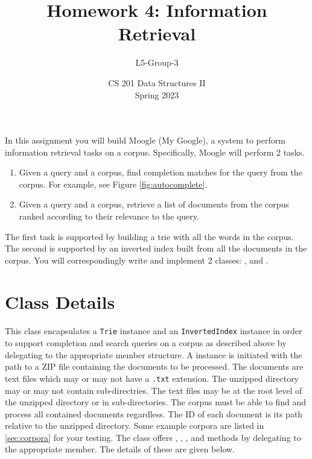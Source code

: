 \documentclass[addpoints]{exam}
\title{Homework 4: Information Retrieval}
\author{L5-Group-3}  %
\date{CS 201 Data Structures II\\Spring 2023}
\begin{document}
\maketitle

In this assignment you will build Moogle (My Google), a system to perform information retrieval tasks on a corpus. Specifically, Moogle will perform 2 tasks.
\begin{enumerate}
  \item Given a query and a corpus, find completion matches for the query from the corpus. For example, see Figure \ref{fig:autocomplete}.
  \item Given a query and a corpus, retrieve a list of documents from the corpus ranked according to their relevance to the query.
\end{enumerate}

The first task is supported by building a trie with all the words in the corpus. The second is supported by an inverted index built from all the documents in the corpus. You will correspondingly write and implement 2 classes: , and .

\section{Class Details}

\paragraph{} This class encapsulates a \texttt{Trie} instance and an \texttt{InvertedIndex} instance in order to support completion and search queries on a corpus as described above by delegating to the appropriate member structure. A  instance is initiated with the path to a ZIP file containing the documents to be processed. The documents are text files which may or may not have a \texttt{.txt} extension. The unzipped directory may or may not contain sub-directries. The text files may be at the root level of the unzipped directory or in sub-directories. The corpus must be able to find and process all contained documents regardless. The ID of each document is its path relative to the unzipped directory. Some example corpora are listed in \cref{sec:corpora} for your testing. The class offers , , , and  methods by delegating to the appropriate member. The details of these are given below.
\end{document}
